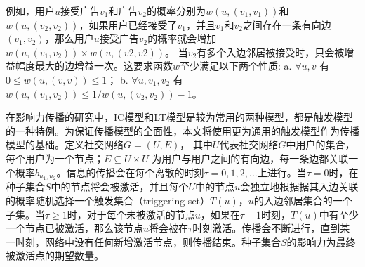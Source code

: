 例如，用户$u$接受广告$v_1$和广告$v_2$的概率分别为$w(u,(v_1,v_1))$和$w(u,(v_2,v_2))$，如果用户已经接受了$v_1$，并且$v_1$和$v_2$之间存在一条有向边$(v_1,v_2)$，那么用户$u$接受广告$v_2$的概率就会增加$w(u,(v_1,v_2)) \times w(u,(v2,v2))$。 当$v_2$有多个入边邻居被接受时，只会被增益幅度最大的边增益一次。这要求函数$w$至少满足以下两个性质:
a. $ \forall u,v$ 有 $0\le w(u,(v,v))\le 1 $；
b. $\forall u,v_1,v_2$ 有$w(u,(v_1,v_2))\le 1/w(u,(v_2,v_2))-1$。

在影响力传播的研究中，IC模型和LT模型是较为常用的两种模型，都是触发模型的一种特例\cite{kempe2003maximizing}。为保证传播模型的全面性，本文将使用更为通用的触发模型作为传播模型的基础。定义社交网络$G=(U,E)$， 其中$U$代表社交网络$G$中用户的集合，每个用户为一个节点；$E\subseteq U\times U$ 为用户与用户之间的有向边，每一条边都关联一个概率$b_{u_1,u_2}$。信息的传播会在每个离散的时刻$\tau =0,1,2, ...$上进行。当$\tau = 0$时，在种子集合$S$中的节点将会被激活，并且每个$U$中的节点$u$会独立地根据据其入边关联的概率随机选择一个触发集合（triggering set）$T(u)$，$u$的入边邻居集合的一个子集。当$\tau \ge 1$时，对于每个未被激活的节点$u$，如果在$\tau -1$时刻，$T(u)$中有至少一个节点已被激活，那么该节点$u$将会被在$\tau$时刻激活。传播会不断进行，直到某一时刻，网络中没有任何新增激活节点，则传播结束。种子集合$S$的影响力为最终被激活点的期望数量。

